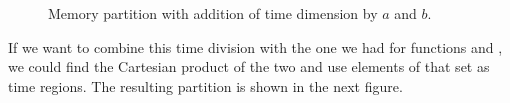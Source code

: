 \documentclass[..thesis.tex]{subfiles}
\newcommand{\opacity}{0.8}
\newcommand{\drawcube}[7]
{
      \filldraw[opacity=\opacity, #7, draw=black, dashed, xzp=#2] (#1,#3) rectangle (#4,#6);
      \filldraw[opacity=\opacity, #7, draw=black, dashed, xzp=#5] (#1,#3) rectangle (#4,#6);
      \filldraw[opacity=\opacity, #7, draw=black, dashed, xyp=#3] (#1,#2) rectangle (#4,#5);
      \filldraw[opacity=\opacity, #7, draw=black, dashed, xyp=#6] (#1,#2) rectangle (#4,#5);
      \filldraw[opacity=\opacity, #7, draw=black, dashed, yzp=#4] (#2,#3) rectangle (#5,#6);
}
\newcommand{\drawcubeoverz}[5]
{
 \drawcube{#1}{#2}{0}{#3}{#4}{\cubez}{#5}
}
\newcommand{\drawoutercube}
{
      \draw[thick,-] (0,0,0) -- ++(\cubex,0,0) -- ++(0,0,\cubez) -- node [anchor = north] {$B$} ++(-0.5*\cubex,0,0) --  node [anchor = north] {$A$} ++(-0.5*\cubex,0,0)  --   ++(0,0,-\cubez);
      \draw[thick,-] (0,\cubey,0) -- ++(\cubex,0,0) -- ++(0,0,\cubez) -- ++(-\cubex,0,0) --   ++(0,0,-\cubez)  ;

      \draw[thick,-] (0,0,0) -- (0,\cubey,0);
      \draw[thick,-] (\cubex,0,0) -- (\cubex,\cubey,0);
      \draw[thick,-] (\cubex,0,\cubez) -- ++(0,\cubey,0);
      \draw[thick,-] (0,0,\cubez) -- (0,\cubey,\cubez);
}
\newcommand{\aColor}{blue}
\newcommand{\aLColor}{\aColor!30}
\newcommand{\aRColor}{\aColor!75}
\newcommand{\bColor}{green}
\newcommand{\bLColor}{\bColor!50}
\newcommand{\bRColor}{\bColor!95}
\newcommand{\defaultColor}{red}
\newcommand{\defaultLColor}{\defaultColor!30}
\newcommand{\defaultRColor}{\defaultColor!75}
\begin{document}

\begin{figure}[H]
  \centering
    \caption{Memory partition with addition of time dimension by $a$ and $b$.}
\end{figure}

If we want to combine this time division with the one we had for functions  and , we could find the Cartesian product of the two and use elements of that set as time regions. The resulting partition is shown in the next figure.
\end{document}
